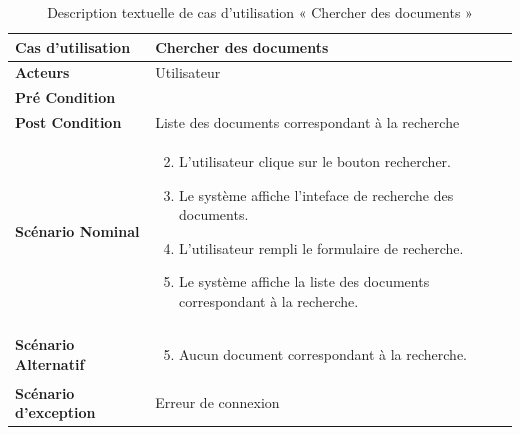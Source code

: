 \begin{longtable}{|p{5cm}|p{10cm}|}
  \caption{Description textuelle de cas d'utilisation « Chercher des documents »} \label{tab:DescriptionTextuelleDeCasDUtilisationChercherDesDocuments} \\
\hline
\textbf{Cas d'utilisation}&Chercher des documents\\
\hline
\textbf{Acteurs}&Utilisateur\\
\hline
\textbf{Pré Condition}&\\
\hline
\textbf{Post Condition}&Liste des documents correspondant à la recherche\\
\hline
\textbf{Scénario Nominal}&
\vspace{-\baselineskip}
\begin{enumerate}
    \setcounter{enumi}{1}
    \item L'utilisateur clique sur le bouton rechercher.
    \item Le système affiche l'inteface de recherche des documents.
    \item L'utilisateur rempli le formulaire de recherche.
    \item Le système affiche la liste des documents correspondant à la recherche.
\end{enumerate}\\
\hline
\textbf{Scénario Alternatif}&
\vspace{-\baselineskip}
\begin{enumerate}
    \setcounter{enumi}{4}
    \item Aucun document correspondant à la recherche.
\end{enumerate}\\
\hline
\textbf{Scénario d'exception}&Erreur de connexion\\
\hline

\end{longtable}


